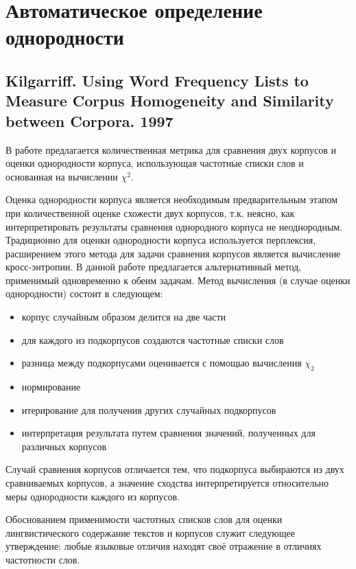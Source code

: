  






\chapter{Автоматическое определение однородности}

\section{Kilgarriff. Using Word Frequency Lists to Measure Corpus Homogeneity and Similarity between Corpora. 1997}

В работе предлагается количественная метрика для сравнения двух корпусов и оценки однородности корпуса, использующая частотные списки слов и основанная на вычислении $\chi^2$.

Оценка однородности корпуса является необходимым предварительным этапом при количественной оценке схожести двух корпусов, т.к. неясно, как интерпретировать результаты сравнения однородного корпуса не неоднородным. Традиционно для оценки однородности корпуса используется перплексия, расширением этого метода для задачи сравнения корпусов является вычисление кросс-энтропии. В данной работе предлагается альтернативный метод, применимый одновременно к обеим задачам. Метод вычисления (в случае оценки однородности) состоит в следующем:
\begin{itemize}
    \item корпус случайным образом делится на две части
    \item для каждого из подкорпусов создаются частотные списки слов
    \item разница между подкорпусами оценивается с помощью вычисления $\chi_2$
    \item нормирование
    \item итерирование для получения других случайных подкорпусов
    \item интерпретация результата путем сравнения значений, полученных для различных корпусов
\end{itemize}
Случай сравнения корпусов отличается тем, что подкорпуса выбираются из двух сравниваемых корпусов, а значение сходства интерпретируется относительно меры однородности каждого из корпусов.

Обоснованием применимости частотных списков слов для оценки лингвистического содержание текстов и корпусов служит следующее утверждение: любые языковые отличия находят своё отражение в отличиях частотности слов. 

